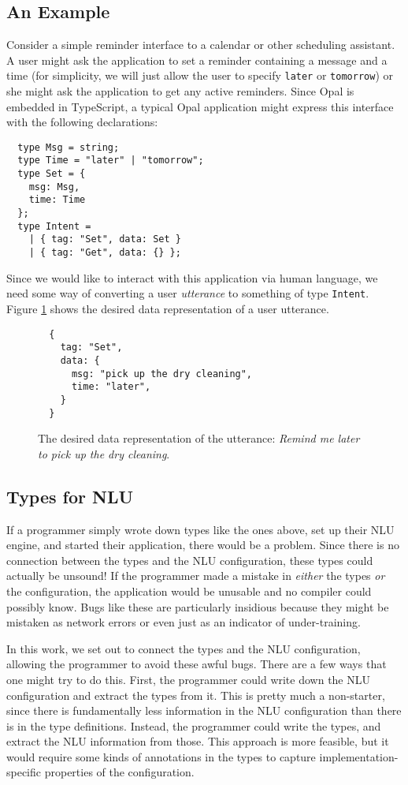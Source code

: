 \documentclass[twocolumn]{article}
\newcommand{\ts}[1]{\texttt{#1}}
\begin{document}
\subsection{An Example}
Consider a simple reminder interface to a calendar or other scheduling
assistant. A user might ask the application to set a reminder containing a
message and a time (for simplicity, we will just allow the user to specify
\ts{later} or \ts{tomorrow}) or she might ask the application to get any active
reminders. Since Opal is embedded in TypeScript,\cite{typescript} a typical Opal
application might express this interface with the following declarations:
\begin{verbatim}
  type Msg = string;
  type Time = "later" | "tomorrow";
  type Set = {
    msg: Msg,
    time: Time
  };
  type Intent =
    | { tag: "Set", data: Set }
    | { tag: "Get", data: {} };
\end{verbatim}

Since we would like to interact with this application via human language, we
need some way of converting a user \emph{utterance} to something of type
\ts{Intent}. Figure \ref{fig:drycleaning} shows the desired
data representation of a user utterance.

\begin{figure}
\begin{verbatim}
  {
    tag: "Set",
    data: {
      msg: "pick up the dry cleaning",
      time: "later",
    }
  }
\end{verbatim}
  \caption{The desired data representation of the utterance: \emph{Remind me
      later to pick up the dry cleaning}.}
  \label{fig:drycleaning}
\end{figure}

\subsection{Types for NLU}
If a programmer simply wrote down types like the ones above, set up their NLU
engine, and started their application, there would be a problem. Since there is
no connection between the types and the NLU configuration, these types could
actually be unsound! If the programmer made a mistake in \emph{either} the types
\emph{or} the configuration, the application would be unusable and no compiler
could possibly know. Bugs like these are particularly insidious because they
might be mistaken as network errors or even just as an indicator of
under-training.

In this work, we set out to connect the types and the NLU configuration,
allowing the programmer to avoid these awful bugs. There are a few ways that one
might try to do this. First, the programmer could write down the NLU
configuration and extract the types from it. This is pretty much a non-starter,
since there is fundamentally less information in the NLU configuration than
there is in the type definitions. Instead, the programmer could write the types,
and extract the NLU information from those. This approach is more feasible, but
it would require some kinds of annotations in the types to capture
implementation-specific properties of the configuration.
\end{document}
